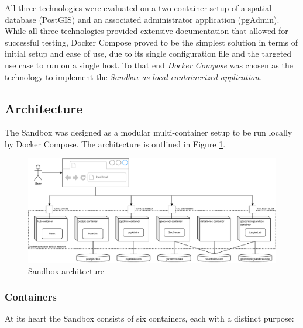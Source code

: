 \documentclass[11pt, a4paper, oneside, parskip=full-]{scrartcl}
\begin{document}
All three technologies were evaluated on a two container setup of a spatial
database (PostGIS) and an associated administrator application (pgAdmin). While
all three technologies provided extensive documentation that allowed for
successful testing, Docker Compose proved to be the simplest solution in terms
of initial setup and ease of use, due to its single configuration file and the
targeted use case to run on a single host. To that end \emph{Docker Compose} was
chosen as the technology to implement the \emph{Sandbox as local containerized
application}.


\subsection{Architecture}
The Sandbox was designed as a modular multi-container setup to be run locally by
Docker Compose. The architecture is outlined in Figure \ref{fig:sandboxsetup}.

\begin{figure}[H]
  \centering
  \includegraphics[width=1\textwidth]{composeSetup}
  \caption{Sandbox architecture}
  \label{fig:sandboxsetup}
\end{figure}

\subsubsection*{Containers}
At its heart the Sandbox consists of six containers, each with a distinct
purpose:
\end{document}
